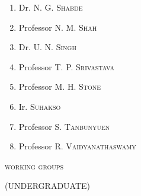 \begin{enumerate}
\item Dr. \textsc{N. G. Shabde}

\item Professor \textsc{N. M. Shah}

\item Dr. \textsc{U. N. Singh}

\item Professor \textsc{T. P. Srivastava}

\item Professor \textsc{M. H. Stone}

\item Ir. \textsc{Suhakso}

\item Professor \textsc{S. Tanbunyuen}

\item Professor \textsc{R. Vaidyanathaswamy}
\end{enumerate}

\newpage

\begin{center}
\textsc{working groups}\pageoriginale
\medskip

(UNDERGRADUATE)
\end{center}


